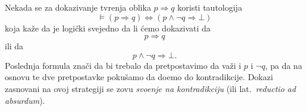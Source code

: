 Nekada se za dokazivanje tvr\dj enja oblika $p \Rightarrow q$ koristi tautologija
$$
  \vDash (p \Rightarrow q) \Leftrightarrow (p \land \lnot q \Rightarrow \bot)
$$
koja ka\v ze da je logi\v cki svejedno da li \'cemo dokazivati da
$$
  p \Rightarrow q
$$
ili da
$$
  p \land \lnot q \Rightarrow \bot.
$$
Poslednja formula zna\v ci da bi trebalo da pretpostavimo da va\v zi i $p$ i $\lnot q$, pa da
na osnovu te dve pretpostavke poku\v samo da do\dj emo do kontradikcije.
Dokazi zasnovani na ovoj strategiji se zovu \emph{svo\dj enje na kontradikciju} (ili lat.\ \emph{reductio ad absurdum}).


